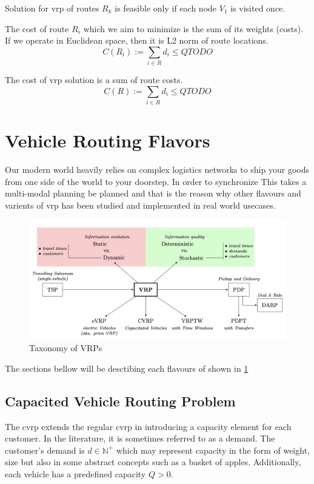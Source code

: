     Solution for \gls{vrp} of routes $R_k$ is feasible only if each node $V_1$ is visited once.
    
    The cost of route $R_i$ which we aim to minimize is the sum of its weights (costs). If we operate in Euclidean space, then it is L2 norm of route locations.
    \begin{equation}
        C(R_i) := \sum_{i \in R} d_i \leq Q TODO
    \end{equation}
    
    The cost of \gls{vrp} solution is a sum of route costs.
    \begin{equation}
        C(R) := \sum_{i \in R} d_i \leq Q TODO
    \end{equation}
    
\section{Vehicle Routing Flavors}
Our modern world heavily relies on complex logistics networks to ship your goods from one side of the world to your doorstep. In order to synchronize This takes a multi-modal planning be planned and that is the reason why other flavours and varients of \gls{vrp} has been studied and implemented in real world usecases.

    \begin{figure}[ht]
        \centering
        \includegraphics[width=1.0\textwidth]{resources/intro/vrp-flavours.png}
        \caption{Taxonomy of VRPs \cite{bono-stochastic-vrp}}
        \label{fig:vrp-flavours}
    \end{figure}

The sections bellow will be desctibing each flavours of shown in \ref{fig:vrp-flavours}

    \subsection{Capacited Vehicle Routing Problem}
    The \gls{cvrp} extends the regular \gls{cvrp} in introducing a capacity element for each customer. In the literature, it is sometimes referred to as a demand. The customer's demand is $d \in \mathbb{N}^+$ which may represent capacity in the form of weight, size but also in some abstract concepts such as a basket of apples. Additionally, each vehicle has a predefined capacity $Q > 0$.
    
